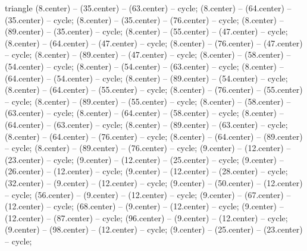 \begin{pgfonlayer}{triangle}
 (8.center) -- (35.center) -- (63.center) -- cycle; 
 (8.center) -- (64.center) -- (35.center) -- cycle; 
 (8.center) -- (35.center) -- (76.center) -- cycle; 
 (8.center) -- (89.center) -- (35.center) -- cycle; 
 (8.center) -- (55.center) -- (47.center) -- cycle; 
 (8.center) -- (64.center) -- (47.center) -- cycle; 
 (8.center) -- (76.center) -- (47.center) -- cycle; 
 (8.center) -- (89.center) -- (47.center) -- cycle; 
 (8.center) -- (58.center) -- (54.center) -- cycle; 
 (8.center) -- (54.center) -- (63.center) -- cycle; 
 (8.center) -- (64.center) -- (54.center) -- cycle; 
 (8.center) -- (89.center) -- (54.center) -- cycle; 
 (8.center) -- (64.center) -- (55.center) -- cycle; 
 (8.center) -- (76.center) -- (55.center) -- cycle; 
 (8.center) -- (89.center) -- (55.center) -- cycle; 
 (8.center) -- (58.center) -- (63.center) -- cycle; 
 (8.center) -- (64.center) -- (58.center) -- cycle; 
 (8.center) -- (64.center) -- (63.center) -- cycle; 
 (8.center) -- (89.center) -- (63.center) -- cycle; 
 (8.center) -- (64.center) -- (76.center) -- cycle; 
 (8.center) -- (64.center) -- (89.center) -- cycle; 
 (8.center) -- (89.center) -- (76.center) -- cycle; 
 (9.center) -- (12.center) -- (23.center) -- cycle; 
 (9.center) -- (12.center) -- (25.center) -- cycle; 
 (9.center) -- (26.center) -- (12.center) -- cycle; 
 (9.center) -- (12.center) -- (28.center) -- cycle; 
 (32.center) -- (9.center) -- (12.center) -- cycle; 
 (9.center) -- (50.center) -- (12.center) -- cycle; 
 (56.center) -- (9.center) -- (12.center) -- cycle; 
 (9.center) -- (67.center) -- (12.center) -- cycle; 
 (68.center) -- (9.center) -- (12.center) -- cycle; 
 (9.center) -- (12.center) -- (87.center) -- cycle; 
 (96.center) -- (9.center) -- (12.center) -- cycle; 
 (9.center) -- (98.center) -- (12.center) -- cycle; 
 (9.center) -- (25.center) -- (23.center) -- cycle; 

\end{pgfonlayer}
